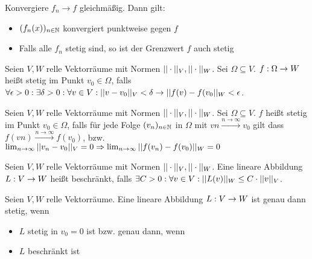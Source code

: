 \begin{satz}
	Konvergiere $f_n \rightarrow f$ gleichmäßig. Dann gilt:
	\begin{itemize}[noitemsep]
		\item $(f_n(x))_{n \in \mathbb{N}}$ konvergiert punktweise gegen $f$
		\item Falls alle $f_n$ stetig sind, so ist der Grenzwert $f$ auch stetig 
	\end{itemize} 
\end{satz}

\begin{definition}
	Seien $V,W$ relle Vektorräume mit Normen $|| \cdot ||_V, || \cdot ||_W$. Sei $\Omega \subseteq V$. $f : \Omega \rightarrow W$ heißt stetig im Punkt $v_0 \in \Omega$, falls $\forall \epsilon > 0: \exists \delta > 0: \forall v \in V : ||v - v_0||_V < \delta \rightarrow ||f(v) - f(v_0||_W < \epsilon$.
\end{definition}

\begin{definition}
	Seien $V,W$ relle Vektorräume mit Normen $|| \cdot ||_V, || \cdot ||_W$. Sei $\Omega \subseteq V$. $f$ heißt stetig im Punkt $v_0 \in \Omega$, falls für jede Folge $(v_{n})_{n \in \mathbb{N}}$ in $\Omega$ mit $vn \overset{n \rightarrow \infty}{\rightarrow} v_0$ gilt dass $f(vn) \overset{n \rightarrow \infty}{\rightarrow} f(v_0)$, bzw. $\lim_{n \rightarrow \infty} ||v_n - v_0||_V = 0 \Rightarrow \lim_{n \rightarrow \infty} ||f(v_n) - f(v_0)||_W = 0$ 
\end{definition}

\begin{definition}
	Seien $V,W$ relle Vektorräume mit Normen $|| \cdot ||_V, || \cdot ||_W$. Eine lineare Abbildung $L : V \rightarrow W$ heißt beschränkt, falls $\exists C > 0 : \forall v \in V : ||L(v)||_W \leq C \cdot ||v||_V$.
\end{definition}

\begin{satz}
		Seien $V,W$ relle Vektorräume. Eine lineare Abbildung $L : V \rightarrow W$ ist genau dann stetig, wenn
		\begin{itemize}[noitemsep]
			\item $L$ stetig in $v_0 = 0$ ist bzw. genau dann, wenn
			\item $L$ beschränkt ist
		\end{itemize}
\end{satz}

